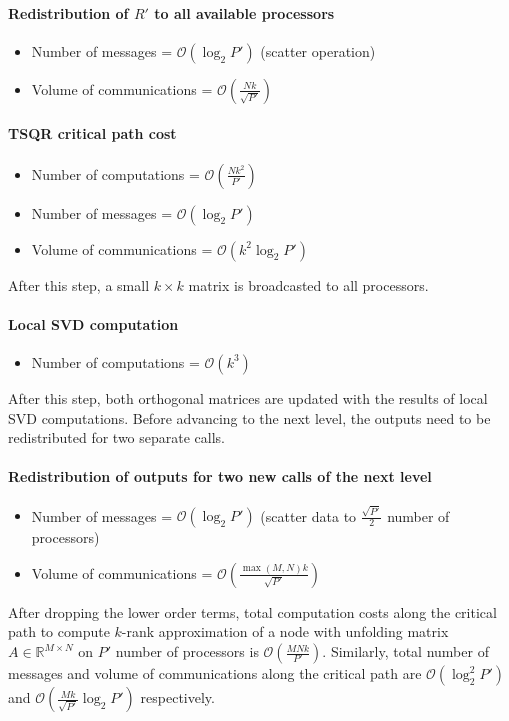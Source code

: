 \documentclass[sigconf]{acmart}
\begin{document}
\paragraph{Redistribution of $R'$ to all available processors}
\begin{itemize}
	\item Number of messages = $\mathcal{O}(\log_2 P')$ (scatter operation)
	\item Volume of communications = $\mathcal{O}(\frac{Nk}{\sqrt{P'}})$ 
\end{itemize}
\paragraph{TSQR critical path cost}
\begin{itemize}
	\item Number of computations = $\mathcal{O}(\frac{Nk^2}{P'})$
	\item Number of messages = $\mathcal{O}(\log_2 P')$
	\item Volume of communications = $\mathcal{O}(k^2 \log_2 P')$ 
\end{itemize}
After this step, a small $k\times k$ matrix is broadcasted to all processors.
\paragraph{Local SVD computation}
\begin{itemize}
	\item Number of computations = $\mathcal{O}(k^3)$
\end{itemize}
After this step, both orthogonal matrices are updated with the results of local SVD computations. Before advancing to the next level, the outputs need to be redistributed for two separate calls.
\paragraph{Redistribution of outputs for two new calls of the next level}
\begin{itemize}
	\item Number of messages = $\mathcal{O}(\log_2 P')$ (scatter data to $\frac{\sqrt{P'}}{2}$ number of processors)
	\item Volume of communications = $\mathcal{O}(\frac{\max(M,N)k}{\sqrt{P'}})$ 
\end{itemize}
After dropping the lower order terms, total computation costs along the critical path to compute $k$-rank approximation of a node with unfolding matrix $A\in \mathbb{R}^{M\times N}$ on $P'$ number of processors is $\mathcal{O}(\frac{MNk}{P'})$. Similarly, total number of messages and volume of communications along the critical path are
 $\mathcal{O}(\log_2^2P')$ and $\mathcal{O}(\frac{Mk}{\sqrt{P'}} \log_2 P')$ respectively.
\end{document}
